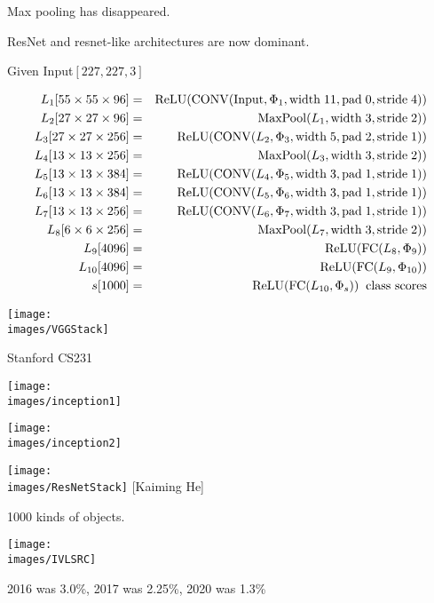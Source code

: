{\vfill
Max pooling has disappeared.

\vfill
ResNet and resnet-like architectures are now dominant.

{\huge
\centerline{Given Input$[227,227,3]$}

\begin{eqnarray*}
L_1[55 \times 55 \times 96] & = & \mathrm{ReLU}(\mathrm{CONV}(\mathrm{Input},\Phi_1,\mathrm{width}\;11,\mathrm{pad}\;0,\mathrm{stride}\;4)) \\
L_2[27 \times 27 \times 96] & = & \mathrm{MaxPool}(L_1,\mathrm{width}\;3,\mathrm{stride}\;2))  \\
L_3[27 \times 27 \times 256] & = & \mathrm{ReLU}(\mathrm{CONV}(L_2,\Phi_3,\mathrm{width}\;5,\mathrm{pad}\;2,\mathrm{stride}\;1))  \\
L_4[13 \times 13 \times 256] & = & \mathrm{MaxPool}(L_3,\mathrm{width}\;3,\mathrm{stride}\;2))  \\
L_5[13 \times 13 \times 384] & = & \mathrm{ReLU}(\mathrm{CONV}(L_4,\Phi_5,\mathrm{width}\;3,\mathrm{pad}\;1,\mathrm{stride}\;1))  \\
L_6[13 \times 13 \times 384] & = & \mathrm{ReLU}(\mathrm{CONV}(L_5,\Phi_6,\mathrm{width}\;3,\mathrm{pad}\;1,\mathrm{stride}\;1))  \\
L_7[13 \times 13 \times 256] & = & \mathrm{ReLU}(\mathrm{CONV}(L_6,\Phi_7,\mathrm{width}\;3,\mathrm{pad}\;1,\mathrm{stride}\;1))  \\
L_8[6 \times 6 \times 256] & = & \mathrm{MaxPool}(L_7,\mathrm{width}\;3,\mathrm{stride}\;2)) \\
L_9[4096] & = & \mathrm{ReLU}(\mathrm{FC}(L_8,\Phi_9)) \\
L_{10}[4096] & = & \mathrm{ReLU}(\mathrm{FC}(L_9,\Phi_{10})) \\
s[1000] & = & \mathrm{ReLU}(\mathrm{FC}(L_{10},\Phi_s)) \;\;\mbox{class scores}
\end{eqnarray*}
}

\centerline{\texttt{[image: \\images/VGGStack]}}
\centerline{\large Stanford CS231}


\centerline{\texttt{[image: \\images/inception1]}}
\vfill
\centerline{\texttt{[image: \\images/inception2]}}

\centerline{\texttt{[image: \\images/ResNetStack]} {\large [Kaiming He]}}


1000 kinds of objects.

\vfill
\centerline{\texttt{[image: \\images/IVLSRC]}}
2016 was 3.0\%, 2017 was  2.25\%, 2020 was 1.3\%
 
}


